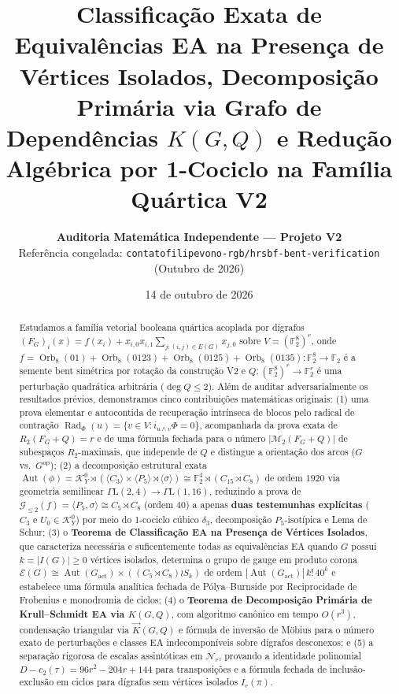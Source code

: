 \documentclass[11pt,a4paper]{article}
\title{\vspace{-1.2em}\textbf{\color{primary}Classificação Exata de Equivalências EA na Presença de Vértices Isolados, Decomposição Primária via Grafo de Dependências $K(G,Q)$ e Redução Algébrica por 1-Cociclo na Família Quártica V2}}
\author{\textbf{Auditoria Matemática Independente — Projeto V2}\\
\small Referência congelada: \texttt{contatofilipevono-rgb/hrsbf-bent-verification} (Outubro de 2026)}
\date{14 de outubro de 2026}
\theoremstyle{definition}
\theoremstyle{remark}
\newcommand{\F}{\mathbb{F}_2}
\newcommand{\Aut}{\operatorname{Aut}}
\newcommand{\Rad}{\operatorname{Rad}}
\newcommand{\Orb}{\operatorname{Orb}}
\newcommand{\GammaL}{\Gamma\mathrm{L}}
\begin{document}
\sloppy
\maketitle

\begin{abstract}
\noindent
Estudamos a família vetorial booleana quártica acoplada por dígrafos $(F_G)_i(x) = f(x_i) + x_{i,0}x_{i,1}\sum_{j:(i,j)\in E(G)} x_{j,0}$ sobre $V = (\F^8)^r$, onde $f = \Orb_8(01) + \Orb_8(0123) + \Orb_8(0125) + \Orb_8(0135) : \F^8 \to \F$ é a semente bent simétrica por rotação da construção V2 e $Q : (\F^8)^r \to \F^r$ é uma perturbação quadrática arbitrária ($\deg Q \le 2$). Além de auditar adversarialmente os resultados prévios, demonstramos cinco contribuições matemáticas originais:
(1) uma prova elementar e autocontida de recuperação intrínseca de blocos pelo radical de contração $\Rad_\Phi(u) = \{v \in V : i_{u\wedge v}\Phi = 0\}$, acompanhada da prova exata de $R_2(F_G+Q) = r$ e de uma fórmula fechada para o número $|\mathcal{M}_2(F_G+Q)|$ de subespaços $R_2$-maximais, que independe de $Q$ e distingue a orientação dos arcos ($G$ vs.\ $G^{\mathrm{op}}$);
(2) a decomposição estrutural exata $\Aut(\phi) = \mathcal{K}_Y^0 \rtimes (\langle C_3\rangle \times \langle P_5\rangle \rtimes \langle\sigma\rangle) \cong \F^4 \rtimes (C_{15} \rtimes C_8)$ de ordem $1920$ via geometria semilinear $\GammaL(2,4) \to \GammaL(1,16)$, reduzindo a prova de $\mathcal{G}_{\le 2}(f) = \langle P_5,\sigma\rangle \cong C_5 \rtimes C_8$ (ordem $40$) a apenas \textbf{duas testemunhas explícitas} ($C_3$ e $U_0 \in \mathcal{K}_Y^0$) por meio do 1-cociclo cúbico $\delta_3$, decomposição $P_5$-isotípica e Lema de Schur;
(3) o \textbf{Teorema de Classificação EA na Presença de Vértices Isolados}, que caracteriza necessária e suficentemente todas as equivalências EA quando $G$ possui $k = |I(G)| \ge 0$ vértices isolados, determina o grupo de gauge em produto corona $\mathcal{E}(G) \cong \Aut(G_{\mathrm{act}}) \times ((C_5 \rtimes C_8) \wr S_k)$ de ordem $|\Aut(G_{\mathrm{act}})|\,k!\,40^k$ e estabelece uma fórmula analítica fechada de Pólya--Burnside por Reciprocidade de Frobenius e monodromia de ciclos;
(4) o \textbf{Teorema de Decomposição Primária de Krull--Schmidt EA via $K(G,Q)$}, com algoritmo canônico em tempo $O(r^3)$, condensação triangular via $\vec{K}(G,Q)$ e fórmula de inversão de Möbius para o número exato de perturbações e classes EA indecomponíveis sobre dígrafos desconexos; e
(5) a separação rigorosa de escalas assintóticas em $\mathcal{N}_r$, provando a identidade polinomial $D - c_2(\tau) = 96r^2 - 204r + 144$ para transposições e a fórmula fechada de inclusão-exclusão em ciclos para dígrafos sem vértices isolados $I_r(\pi)$.
\end{abstract}
\end{document}
